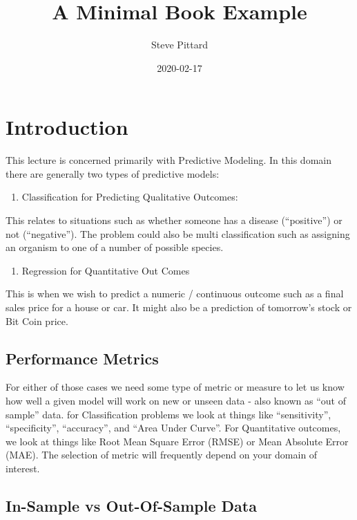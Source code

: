 \documentclass[]{book}
\title{A Minimal Book Example}
\author{Steve Pittard}
\date{2020-02-17}
\providecommand{\tightlist}{%
  \setlength{\itemsep}{0pt}\setlength{\parskip}{0pt}}
\begin{document}
\maketitle

{
\setcounter{tocdepth}{1}
\tableofcontents
}
\chapter{Introduction}\label{intro}

This lecture is concerned primarily with Predictive Modeling. In this
domain there are generally two types of predictive models:

\begin{enumerate}
\def\labelenumi{\arabic{enumi})}
\tightlist
\item
  Classification for Predicting Qualitative Outcomes:
\end{enumerate}

This relates to situations such as whether someone has a disease
(``positive'') or not (``negative''). The problem could also be multi
classification such as assigning an organism to one of a number of
possible species.

\begin{enumerate}
\def\labelenumi{\arabic{enumi})}
\setcounter{enumi}{1}
\tightlist
\item
  Regression for Quantitative Out Comes
\end{enumerate}

This is when we wish to predict a numeric / continuous outcome such as a
final sales price for a house or car. It might also be a prediction of
tomorrow's stock or Bit Coin price.

\section{Performance Metrics}\label{performance-metrics}

For either of those cases we need some type of metric or measure to let
us know how well a given model will work on new or unseen data - also
known as ``out of sample'' data. for Classification problems we look at
things like ``sensitivity'', ``specificity'', ``accuracy'', and ``Area
Under Curve''. For Quantitative outcomes, we look at things like Root
Mean Square Error (RMSE) or Mean Absolute Error (MAE). The selection of
metric will frequently depend on your domain of interest.

\section{In-Sample vs Out-Of-Sample
Data}\label{in-sample-vs-out-of-sample-data}
\end{document}
